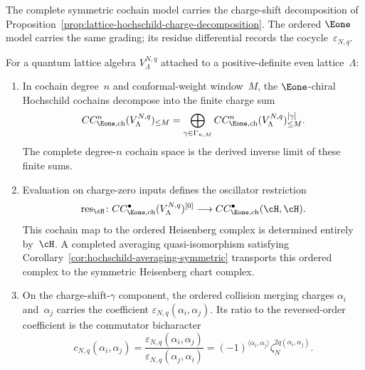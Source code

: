 The complete symmetric cochain model carries the charge-shift
decomposition of
Proposition~\ref{prop:lattice-hochschild-charge-decomposition}.  The
ordered $\Eone$ model carries the same grading; its residue
differential records the cocycle~$\varepsilon_{N,q}$.

\begin{proposition}\label{thm:lattice:e1-hochschild}
\label{prop:lattice:e1-hochschild-charge-shift}
For a quantum lattice algebra $V_\Lambda^{N,q}$ attached to a
positive-definite even lattice~$\Lambda$:
\begin{enumerate}[label=\textup{(\roman*)}]
\item In cochain degree~$n$ and conformal-weight window~$M$, the
 $\Eone$-chiral Hochschild cochains decompose into the finite charge
 sum
 \[
 CC^n_{\Eone,\mathrm{ch}}(V_\Lambda^{N,q})_{\leq M}
 =
 \bigoplus_{\gamma\in\Gamma_{n,M}}
 CC^n_{\Eone,\mathrm{ch}}(V_\Lambda^{N,q})^{[\gamma]}_{\leq M}.
\]
 The complete degree-$n$ cochain space is the derived inverse limit of
 these finite sums.
\item Evaluation on charge-zero inputs defines the oscillator
 restriction
 \[
 \operatorname{res}_{\cH}\colon
 CC^\bullet_{\Eone,\mathrm{ch}}(V_\Lambda^{N,q})^{[0]}
 \longrightarrow CC^\bullet_{\Eone,\mathrm{ch}}(\cH,\cH).
 \]
 This cochain map to the ordered Heisenberg complex is determined
 entirely by~$\cH$.  A completed averaging quasi-isomorphism satisfying
 Corollary~\ref{cor:hochschild-averaging-symmetric} transports this
 ordered complex to the symmetric Heisenberg chart complex.
\item On the charge-shift-$\gamma$ component, the ordered collision
 merging charges $\alpha_i$ and~$\alpha_j$ carries the coefficient
 $\varepsilon_{N,q}(\alpha_i,\alpha_j)$.  Its ratio to the
 reversed-order coefficient is the commutator bicharacter
 \[
 c_{N,q}(\alpha_i,\alpha_j)
 =\frac{\varepsilon_{N,q}(\alpha_i,\alpha_j)}
 {\varepsilon_{N,q}(\alpha_j,\alpha_i)}
 =(-1)^{\langle\alpha_i,\alpha_j\rangle}
 \zeta_N^{2q(\alpha_i,\alpha_j)}.
 \]
\end{enumerate}
\end{proposition}

